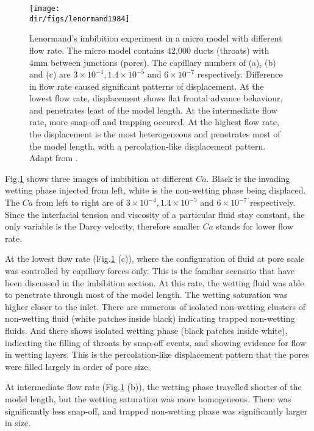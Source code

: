 \begin{figure}[htbp]
  \centering
  \texttt{[image: \\dir/figs/lenormand1984]}
  \caption{Lenormand's imbibition experiment in a micro model with different flow rate. The micro model contains 42,000 ducts (throats) with 4mm between junctions (pores). The capillary numbers of (a), (b) and (c) are $3\times10^{-4}, 1.4\times10^{-5}$ and $6\times10^{-7}$ respectively. Difference in flow rate caused significant patterns of displacement. At the lowest flow rate, displacement shows flat frontal advance behaviour, and penetrates least of the model length. At the intermediate flow rate, more snap-off and trapping occured. At the highest flow rate, the displacement is the most heterogeneous and penetrates most of the model length, with a percolation-like displacement pattern. Adapt from \citet{lenormand1984role}.}
  \label{lenormand}
\end{figure}

Fig.\ref{lenormand} shows three images of imbibition at different $Ca$. Black is the invading wetting phase injected from left, white is the non-wetting phase being displaced. The $Ca$ from left to right are of $3\times10^{-4}, 1.4\times10^{-5}$ and $6\times10^{-7}$ respectively. Since the interfacial tension and viscosity of a particular fluid stay constant, the only variable is the Darcy velocity, therefore smaller $Ca$ stands for lower flow rate.

At the lowest flow rate (Fig.\ref{lenormand} (c)), where the configuration of fluid at pore scale was controlled by capillary forces only. This is the familiar scenario that have been discussed in the imbibition section. At this rate, the wetting fluid was able to penetrate through most of the model length. The wetting saturation was higher closer to the inlet. There are numerous of isolated non-wetting clusters of non-wetting fluid (white patches inside black) indicating trapped non-wetting fluids. And there shows isolated wetting phase (black patches inside white), indicating the filling of throats by snap-off events, and showing evidence for flow in wetting layers. This is the percolation-like displacement pattern that the pores were filled largely in order of pore size.

At intermediate flow rate (Fig.\ref{lenormand} (b)), the wetting phase travelled shorter of the model length, but the wetting saturation was more homogeneous. There was significantly less snap-off, and trapped non-wetting phase was significantly larger in size.

